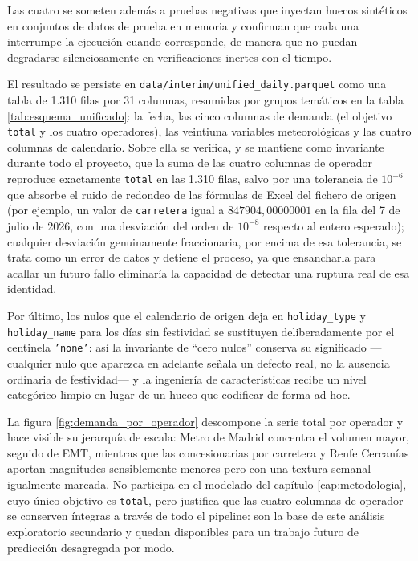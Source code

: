 Las cuatro se someten además a pruebas negativas que inyectan huecos sintéticos en
conjuntos de datos de prueba en memoria y confirman que cada una interrumpe la ejecución
cuando corresponde, de manera que no puedan degradarse silenciosamente en verificaciones
inertes con el tiempo.

El resultado se persiste en \texttt{data/\allowbreak{}interim/\allowbreak{}unified\_daily.parquet} como una tabla
de 1.310 filas por 31 columnas, resumidas por grupos temáticos en la tabla
\ref{tab:esquema_unificado}: la fecha, las cinco columnas de demanda (el objetivo
\texttt{total} y los cuatro operadores), las veintiuna variables meteorológicas y las
cuatro columnas de calendario. Sobre ella se verifica, y se mantiene como invariante
durante todo el proyecto, que la suma de las cuatro columnas de operador reproduce
exactamente \texttt{total} en las 1.310 filas, salvo por una tolerancia de $10^{-6}$ que
absorbe el ruido de redondeo de las fórmulas de Excel del fichero de origen (por ejemplo,
un valor de \texttt{carretera} igual a $847904{,}00000001$ en la fila del 7 de julio de
2026, con una desviación del orden de $10^{-8}$ respecto al entero esperado); cualquier
desviación genuinamente fraccionaria, por encima de esa tolerancia, se trata como un error
de datos y detiene el proceso, ya que ensancharla para acallar un futuro fallo eliminaría
la capacidad de detectar una ruptura real de esa identidad.

Por último, los nulos que el calendario de origen deja en \texttt{holiday\_type} y
\texttt{holiday\_name} para los días sin festividad se sustituyen deliberadamente por el
centinela \texttt{'none'}: así la invariante de ``cero nulos'' conserva su significado
—cualquier nulo que aparezca en adelante señala un defecto real, no la ausencia ordinaria
de festividad— y la ingeniería de características recibe un nivel categórico limpio en
lugar de un hueco que codificar de forma ad hoc.

\begin{table}[htbp]
  \centering
  \small
  
  \caption{}
  \label{tab:esquema_unificado}
\end{table}

La figura \ref{fig:demanda_por_operador} descompone la serie total por operador y hace
visible su jerarquía de escala: Metro de Madrid concentra el volumen mayor, seguido de
EMT, mientras que las concesionarias por carretera y Renfe Cercanías aportan magnitudes
sensiblemente menores pero con una textura semanal igualmente marcada. No participa en el
modelado del capítulo \ref{cap:metodologia}, cuyo único objetivo es \texttt{total}, pero
justifica que las cuatro columnas de operador se conserven íntegras a través de todo el
pipeline: son la base de este análisis exploratorio secundario y quedan disponibles para
un trabajo futuro de predicción desagregada por modo.

